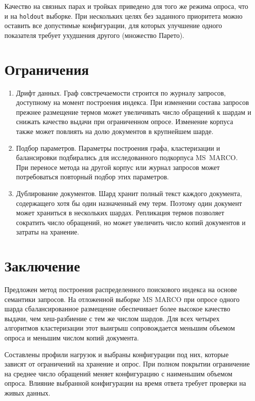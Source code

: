 \documentclass[10pt, a4paper, twoside]{article}
\newcommand{\strategy}[1]{\texttt{#1}}
\begin{document}
\begin{ntvbody}

Качество на связных парах и тройках приведено для того же режима опроса, что и на \strategy{holdout} выборке.
При нескольких целях без заданного приоритета можно оставить все допустимые конфигурации, для которых улучшение одного показателя требует ухудшения другого (множество Парето).

\section{Ограничения}
\begin{enumerate}[nosep,leftmargin=*]
\item Дрифт данных.
Граф совстречаемости строится по журналу запросов, доступному на момент построения индекса.
При изменении состава запросов прежнее размещение термов может увеличивать число обращений к шардам и снижать качество выдачи при ограниченном опросе.
Изменение корпуса также может повлиять на долю документов в крупнейшем шарде.
\item Подбор параметров.
Параметры построения графа, кластеризации и балансировки подбирались для исследованного подкорпуса MS~MARCO.
При переносе метода на другой корпус или журнал запросов может потребоваться повторный подбор этих параметров.
\item Дублирование документов.
Шард хранит полный текст каждого документа, содержащего хотя бы один назначенный ему терм.
Поэтому один документ может храниться в нескольких шардах.
Репликация термов позволяет сократить число обращений, но может увеличить число копий документов и затраты на хранение.
\end{enumerate}

\section{Заключение}

Предложен метод построения распределенного поискового индекса на основе семантики запросов.
На отложенной выборке MS MARCO при опросе одного шарда сбалансированное размещение обеспечивает более высокое качество выдачи, чем хеш-разбиение с тем же числом шардов.
Для всех четырех алгоритмов кластеризации этот выигрыш сопровождается меньшим объемом опроса и меньшим числом копий документа.

Составлены профили нагрузок и выбраны конфигурации под них, которые зависят от ограничений на хранение и опрос.
При полном покрытии ограничение на среднее число обращений меняет конфигурацию с наименьшим объемом опроса.
Влияние выбранной конфигурации на время ответа требует проверки на живых данных.

\end{ntvbody}
\end{document}
